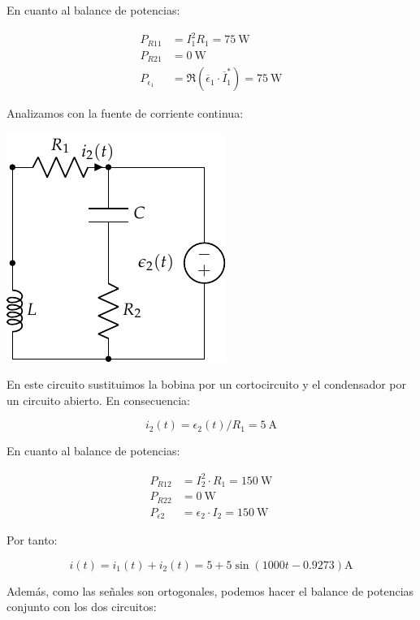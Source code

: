 \documentclass[12pt]{article}
\begin{document}
En cuanto al balance de potencias:

\begin{align*}
  P_{R11} &= I_1^2 R_1 = \SI{75}{\watt}\\
  P_{R21} &= \SI{0}{\watt}\\
  P_{\epsilon_1} &= \Re(\overline{\epsilon}_1 \cdot \overline{I}_1^*) = \SI{75}{\watt}
\end{align*}

Analizamos con la fuente de corriente continua:

\begin{center}
\includegraphics{figs/superposicion1_DC}
\end{center}

En este circuito sustituimos la bobina por un cortocircuito y el condensador por un circuito abierto. En consecuencia:

\begin{equation*}
  i_2(t) = \epsilon_2(t) / R_1 = \SI{5}{\ampere}
\end{equation*}

En cuanto al balance de potencias:

\begin{align*}
  P_{R12} &= I_2^2 \cdot R_1 = \SI{150}{\watt}\\
  P_{R22} &= \SI{0}{\watt}\\
  P_{\epsilon2} &= \epsilon_2 \cdot I_2 = \SI{150}{\watt}
\end{align*}

Por tanto:

\begin{equation*}
  i(t) = i_1(t) + i_2(t) = 5 + 5\sin(1000t - 0.9273)\si{\ampere}
\end{equation*}

Además, como las señales son ortogonales, podemos hacer el balance de potencias conjunto con los dos circuitos:
\end{document}
